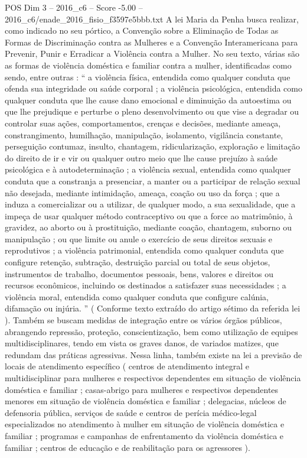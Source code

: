 \begin{textsample}{POS Dim 3 – 2016\_c6 – Score -5.00 – 2016\_c6/enade\_2016\_fisio\_f3597e5bbb.txt}
A lei Maria da Penha busca realizar, como indicado no seu pórtico, a Convenção sobre a Eliminação de Todas as Formas de Discriminação contra as Mulheres e a Convenção Interamericana para Prevenir, Punir e Erradicar a Violência contra a Mulher.
No seu texto, várias são as formas de violência doméstica e familiar contra a mulher, identificadas como sendo, entre outras : “ a violência física, entendida como qualquer conduta que ofenda sua integridade ou saúde corporal ; a violência psicológica, entendida como qualquer conduta que lhe cause dano emocional e diminuição da autoestima ou que lhe prejudique e perturbe o pleno desenvolvimento ou que vise a degradar ou controlar suas ações, comportamentos, crenças e decisões, mediante ameaça, constrangimento, humilhação, manipulação, isolamento, vigilância constante, perseguição contumaz, insulto, chantagem, ridicularização, exploração e limitação do direito de ir e vir ou qualquer outro meio que lhe cause prejuízo à saúde psicológica e à autodeterminação ; a violência sexual, entendida como qualquer conduta que a constranja a presenciar, a manter ou a participar de relação sexual não desejada, mediante intimidação, ameaça, coação ou uso da força ; que a induza a comercializar ou a utilizar, de qualquer modo, a sua sexualidade, que a impeça de usar qualquer método contraceptivo ou que a force ao matrimônio, à gravidez, ao aborto ou à prostituição, mediante coação, chantagem, suborno ou manipulação ; ou que limite ou anule o exercício de seus direitos sexuais e reprodutivos ; a violência patrimonial, entendida como qualquer conduta que configure retenção, subtração, destruição parcial ou total de seus objetos, instrumentos de trabalho, documentos pessoais, bens, valores e direitos ou recursos econômicos, incluindo os destinados a satisfazer suas necessidades ; a violência moral, entendida como qualquer conduta que configure calúnia, difamação ou injúria. ” ( Conforme texto extraído do artigo sétimo da referida lei ).
Também se buscam medidas de integração entre os vários órgãos públicos, abrangendo repressão, proteção, conscientização, bem como utilização de equipes multidisciplinares, tendo em vista os graves danos, de variados matizes, que redundam das práticas agressivas.
Nessa linha, também existe na lei a previsão de locais de atendimento específico ( centros de atendimento integral e multidisciplinar para mulheres e respectivos dependentes em situação de violência doméstica e familiar ; casas-abrigo para mulheres e respectivos dependentes menores em situação de violência doméstica e familiar ; delegacias, núcleos de defensoria pública, serviços de saúde e centros de perícia médico-legal especializados no atendimento à mulher em situação de violência doméstica e familiar ; programas e campanhas de enfrentamento da violência doméstica e familiar ; centros de educação e de reabilitação para os agressores ).

\end{textsample}
